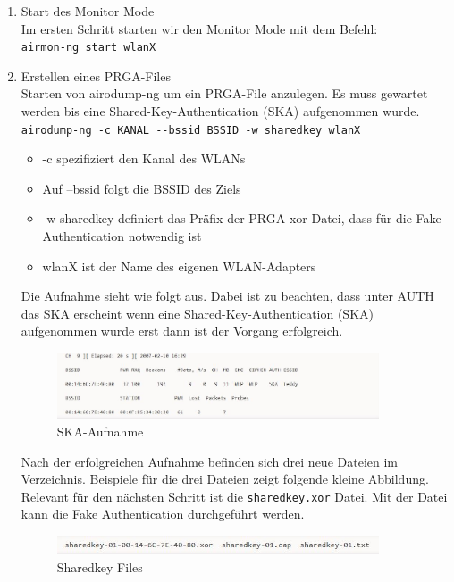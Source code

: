 	\begin{enumerate}
		\item Start des Monitor Mode \\
		 Im ersten Schritt starten wir den Monitor Mode mit dem Befehl: \\ \colorbox{altgray}{\lstinline|airmon-ng start wlanX|}

		\item Erstellen eines PRGA-Files \\
		Starten von airodump-ng um ein PRGA-File anzulegen. Es muss gewartet werden bis eine Shared-Key-Authentication (SKA) aufgenommen wurde.\\
		\colorbox{altgray}{\lstinline|airodump-ng -c KANAL --bssid BSSID -w sharedkey wlanX|} \\
		\begin{itemize}
			\item -c spezifiziert den Kanal des WLANs
			\item Auf --bssid folgt die BSSID des Ziels
			\item -w sharedkey definiert das Präfix der PRGA xor Datei, dass für die Fake Authentication notwendig ist

			\item wlanX ist der Name des eigenen WLAN-Adapters
		\end{itemize}
		Die Aufnahme sieht wie folgt aus. Dabei ist zu beachten, dass unter AUTH das SKA erscheint wenn eine Shared-Key-Authentication (SKA) aufgenommen wurde erst dann ist der Vorgang erfolgreich.
		\begin{figure}[H]
			\centering
			\includegraphics[width=0.9\textwidth]{images/WLAN/beispielSKA.JPG}
			\caption{SKA-Aufnahme}
			\label{fig:SKA-Aufnahme}
		\end{figure}

		Nach der erfolgreichen Aufnahme befinden sich drei neue Dateien im Verzeichnis. Beispiele für die drei Dateien zeigt folgende kleine Abbildung. Relevant für den nächsten Schritt ist die \colorbox{altgray}{\lstinline|sharedkey.xor|} Datei. Mit der Datei kann die Fake Authentication durchgeführt werden.

		\begin{figure}[H]
			\centering
			\includegraphics[width=0.9\textwidth]{images/WLAN/sharedBsp.JPG}
			\caption{Sharedkey Files}
			\label{fig:Sharedkey Files}
		\end{figure}


\end{enumerate}
